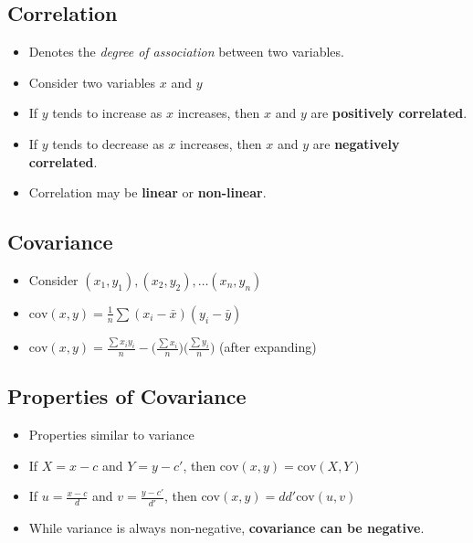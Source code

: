 \subsection*{Correlation}

\begin{itemize}
    \item Denotes the \textit{degree of association} between two variables.
    \item Consider two variables $x$ and $y$
    \item If $y$ tends to increase as $x$ increases, then $x$ and $y$ are \textbf{positively correlated}.
    \item If $y$ tends to decrease as $x$ increases, then $x$ and $y$ are \textbf{negatively correlated}.
    \item Correlation may be \textbf{linear} or \textbf{non-linear}.
\end{itemize}

\subsection*{Covariance}

\begin{itemize}
    \item Consider $(x_1, y_1), (x_2, y_2), \dots (x_n, y_n)$
    \item $\text{cov}(x, y) = \frac{1}{n} \sum (x_i - \bar{x})(y_i - \bar{y})$
    \item $\text{cov}(x, y) = \frac{\sum x_i y_i}{n} - \Big( \frac{\sum x_i}{n} \Big)  \Big( \frac{\sum y_i}{n} \Big)$ (after expanding)
\end{itemize}

\subsection*{Properties of Covariance}

\begin{itemize}
    \item Properties similar to variance
    \item If $X = x - c$ and $Y = y - c'$, then $\text{cov}(x, y) = \text{cov}(X, Y)$
    \item If $u = \frac{x - c}{d}$ and $v = \frac{y - c'}{d'}$, then $\text{cov}(x, y) = dd' \text{cov}(u, v)$
    \item While variance is always non-negative, \textbf{covariance can be negative}.
\end{itemize}

